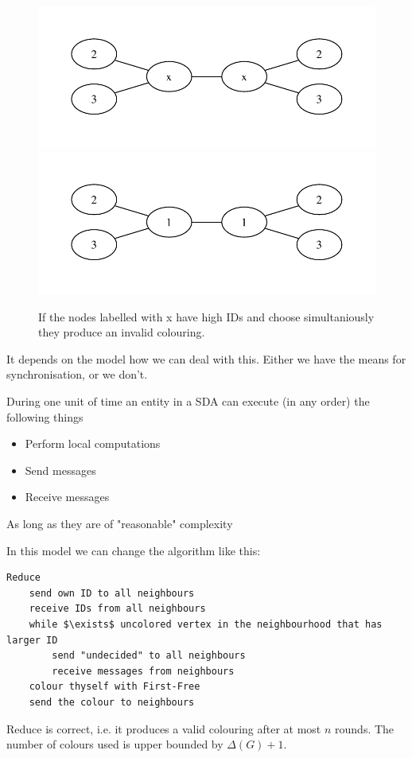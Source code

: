 \begin{figure}
\includegraphics[width=0.5\linewidth]{./images/graph1}
\includegraphics[width=0.5\linewidth]{./images/graph11}
\caption{If the nodes labelled with x have high IDs and choose simultaniously they produce an invalid colouring.}
%
\end{figure}

It depends on the model how we can deal with this. Either we have the means for synchronisation, or we don't.

\begin{Def} During one unit of time an entity in a SDA can execute (in any order) the following things
\begin{itemize}
\item Perform local computations
\item Send messages
\item Receive messages
\end{itemize}

As long as they are of "reasonable" complexity
\end{Def}

In this model we can change the algorithm like this:

\begin{lstlisting}
Reduce
	send own ID to all neighbours
	receive IDs from all neighbours
	while $\exists$ uncolored vertex in the neighbourhood that has larger ID
		send "undecided" to all neighbours
		receive messages from neighbours
	colour thyself with First-Free
	send the colour to neighbours
\end{lstlisting}

\begin{thm} Reduce is correct, i.e. it produces a valid colouring after at most $n$ rounds. The number of colours used is upper bounded by $\Delta(G)+1$. 
\end{thm}

\begin{pr}
\end{pr}